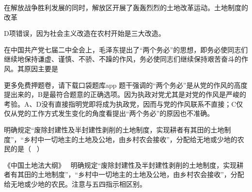 \question 在解放战争胜利发展的同时，解放区开展了轰轰烈烈的土地改革运动。土地制度的改革
\par{}
\begin{solution}D项错误，因为社会主义改造在农村开始是三大改造。
\end{solution}
\question 在中国共产党七届二中全会上，毛泽东提出了``两个务必''的思想，即务必使同志们继续地保持谦虚、谨慎、不骄、不躁的作风，务必使同志们继续保持艰苦奋斗的作风。其原因主要是
\par{}
\begin{solution}更多免费押题卷，请下载口袋题库app
题干强调的``两个务必''是从党的作风的高度提出来的，B是最符合题意的正确选项。因为执政对党尤其是对党的作风是严峻的考验。A、D没有直接指明党即将成为执政党，因而与党的作风联系不直接；C仅仅从党的工作方式发生变化的角度看提出``两个务必''的原因也不准确。
\end{solution}
\question 明确规定``废除封建性及半封建性剥削的土地制度，实现耕者有其田的土地制度''，``乡村中一切地主的土地及公地，由乡村农会接收''，分配给无地或少地的农民的是（
~）
\par{}
\begin{solution}《中国土地法大纲》
~明确规定``废除封建性及半封建性剥削的土地制度，实现耕者有其田的土地制度''，``乡村中一切地主的土地及公地，由乡村农会接收''，分配给无地或少地的农民。注意与五四指示相区别。
\end{solution}
